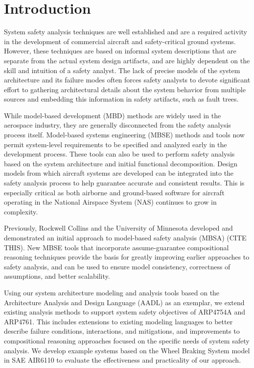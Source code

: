 \section{Introduction}

System safety analysis techniques are well established and are a required activity in the development of commercial aircraft and safety-critical ground systems. However, these techniques are based on informal system descriptions that are separate from the actual system design artifacts, and are highly dependent on the skill and intuition of a safety analyst. The lack of precise models of the system architecture and its failure modes often forces safety analysts to devote significant effort to gathering architectural details about the system behavior from multiple sources and embedding this information in safety artifacts, such as fault trees.

While model-based development (MBD) methods are widely used in the aerospace industry, they are generally disconnected from the safety analysis process itself. Model-based systems engineering (MBSE) methods and tools now permit system-level requirements to be specified and analyzed early in the development process. These tools can also be used to perform safety analysis based on the system architecture and initial functional decomposition. Design models from which aircraft systems are developed can be integrated into the safety analysis process to help guarantee accurate and consistent results. This is especially critical as both airborne and ground-based software for aircraft operating in the National Airspace System (NAS) continues to grow in complexity.

Previously, Rockwell Collins and the University of Minnesota developed and demonstrated an initial approach to model-based safety analysis (MBSA) (CITE THIS). New MBSE tools that incorporate assume-guarantee compositional reasoning techniques provide the basis for greatly improving earlier approaches to safety analysis, and can be used to ensure model consistency, correctness of assumptions, and better scalability.

Using our system architecture modeling and analysis tools based on the Architecture Analysis and Design Language (AADL) as an exemplar, we extend existing analysis methods to support system safety objectives of ARP4754A and ARP4761. This includes extensions to existing modeling languages to better describe failure conditions, interactions, and mitigations, and improvements to compositional reasoning approaches focused on the specific needs of system safety analysis. We develop example systems based on the Wheel Braking System model in SAE AIR6110 to evaluate the effectiveness and practicality of our approach. 

